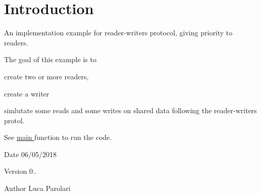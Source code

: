 \hypertarget{index_intro}{}\section{Introduction}\label{index_intro}
An implementation example for reader-\/writers protocol, giving priority to readers.

The goal of this example is to
\begin{DoxyItemize}
\item create two or more readers,
\item create a writer
\item simlutate some reads and some writes on shared data following the reader-\/writers protol.
\end{DoxyItemize}

See \hyperlink{rws_8c_abf9e6b7e6f15df4b525a2e7705ba3089}{main } function to run the code.

\begin{DoxyDate}{Date}
06/05/2018 
\end{DoxyDate}
\begin{DoxyVersion}{Version}
0.. 
\end{DoxyVersion}
\begin{DoxyAuthor}{Author}
Luca Parolari 
\end{DoxyAuthor}
